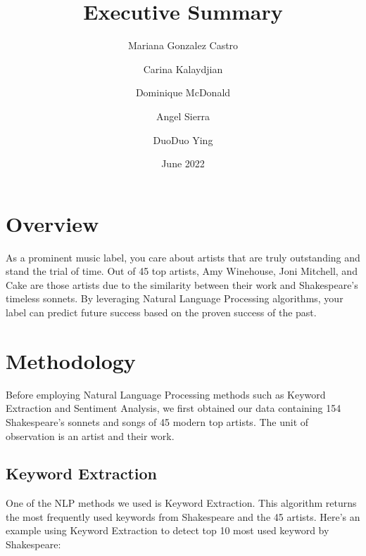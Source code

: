 \documentclass[10pt,a4paper]{article}
\title{Executive Summary}
\author[*]{Mariana Gonzalez Castro}
\author[*]{Carina Kalaydjian}
\author[*]{Dominique McDonald}
\author[*]{Angel Sierra}
\author[*]{DuoDuo Ying}
\affil[*]{Department of Statistics, UCLA}
\date{June 2022}
\begin{document}
\maketitle

\section{Overview}

As a prominent music label, you care about artists that are truly outstanding and stand the trial of time. Out of 45 top artists, Amy Winehouse, Joni Mitchell, and Cake are those artists due to the similarity between their work and Shakespeare's timeless sonnets. By leveraging Natural Language Processing algorithms, your label can predict future success based on the proven success of the past. 


\section{Methodology}

Before employing Natural Language Processing methods such as Keyword Extraction and Sentiment Analysis, we first obtained our data containing 154 Shakespeare's sonnets and songs of 45 modern top artists. The unit of observation is an artist and their work.

\subsection{Keyword Extraction}

One of the NLP methods we used is Keyword Extraction. This algorithm returns the most frequently used keywords from Shakespeare and the 45 artists. Here's an example using Keyword Extraction to detect top 10 most used keyword by Shakespeare:
\end{document}
